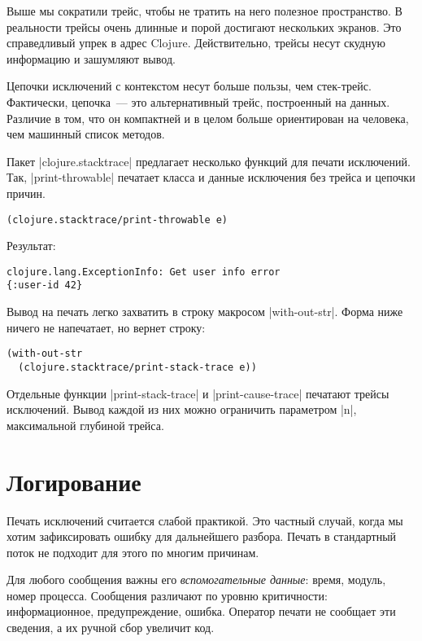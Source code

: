 Выше мы сократили трейс, чтобы не тратить на него полезное пространство. В
реальности трейсы очень длинные и порой достигают нескольких экранов. Это
справедливый упрек в адрес Clojure. Действительно, трейсы несут скудную
информацию и зашумляют вывод.

Цепочки исключений с контекстом несут больше пользы, чем стек-трейс. Фактически,
цепочка~--- это альтернативный трейс, построенный на данных. Различие в том, что
он компактней и в целом больше ориентирован на человека, чем машинный список
методов.

Пакет \spverb|clojure.stacktrace| предлагает несколько функций для печати
исключений. Так, \spverb|print-throwable| печатает класса и данные исключения без
трейса и цепочки причин.

\begin{verbatim}
(clojure.stacktrace/print-throwable e)
\end{verbatim}

Результат:

\begin{verbatim}
clojure.lang.ExceptionInfo: Get user info error
{:user-id 42}
\end{verbatim}

Вывод на печать легко захватить в строку макросом \spverb|with-out-str|. Форма ниже
ничего не напечатает, но вернет строку:

\begin{verbatim}
(with-out-str
  (clojure.stacktrace/print-stack-trace e))
\end{verbatim}

Отдельные функции \spverb|print-stack-trace| и \spverb|print-cause-trace| печатают трейсы
исключений. Вывод каждой из них можно ограничить параметром \spverb|n|, максимальной
глубиной трейса.

\section{Логирование}

Печать исключений считается слабой практикой. Это частный случай, когда мы хотим
зафиксировать ошибку для дальнейшего разбора. Печать в стандартный поток не
подходит для этого по многим причинам.

Для любого сообщения важны его \emph{вспомогательные данные}: время, модуль, номер
процесса. Сообщения различают по уровню критичности: информационное,
предупреждение, ошибка. Оператор печати не сообщает эти сведения, а их ручной
сбор увеличит код.

